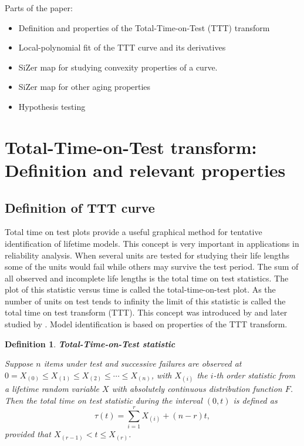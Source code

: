 \documentclass[preprint,12pt]{elsarticle}
\newtheorem{dfn}{{\sc Definition}}[section]
\begin{document}
Parts of the paper:
\begin{itemize}
\item Definition and properties of the Total-Time-on-Test (TTT) transform
\item Local-polynomial fit of the TTT curve and its derivatives
\item SiZer map for studying convexity properties of a curve.
\item SiZer map for other aging properties
\item Hypothesis testing 
\end{itemize}

\section{Total-Time-on-Test transform: Definition and relevant properties} \label{sec:TTT}




\subsection{Definition of TTT curve}\label{sec:TTTdef}

\noindent Total time on test plots provide a useful graphical method for tentative identification of lifetime models. This concept is very important in applications in reliability analysis. When several units are tested for studying their life lengths some of the units would fail while others may survive the test period. The sum of all observed and incomplete life lengths is the total time on test statistics. The plot of this statistic versus time is called the total-time-on-test plot. As the number of units on test tends to infinity the limit of this statistic is called the total time on test transform (TTT). This concept was introduced by \cite{BD1900} and later studied by \cite{BP75}.
Model identification is based on properties of the TTT transform. 

\begin{dfn} \textbf{Total-Time-on-Test statistic} \label{ttt.def1}

\noindent Suppose $n$ items under test and successive failures are observed at $0=X_{(0)} \leq X_{(1)} \leq X_{(2)}\leq \cdots \leq X_{(n)}$, with $X_{(i)}$ the $i$-th order statistic from a lifetime random variable $X$ with absolutely continuous distribution function $F$. Then the \textit{total time on test statistic} during the interval $(0,t)$ is defined as 
\[
\tau (t) = \sum_{i=1}^r X_{(i)}+\left(n-r\right)t,
\]
provided that $X_{(r-1)}<t\leq X_{(r)}$.

\end{dfn}
\end{document}
